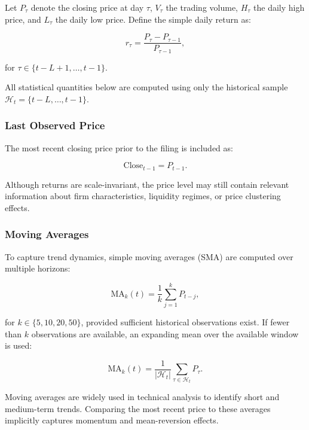 Let $P_\tau$ denote the closing price at day $\tau$, $V_\tau$ the trading volume, $H_\tau$ the daily high price, and $L_\tau$ the daily low price. Define the simple daily return as:

\begin{equation}
r_\tau = \frac{P_\tau - P_{\tau-1}}{P_{\tau-1}},
\end{equation}

for $\tau \in \{t-L+1, \dots, t-1\}$.

All statistical quantities below are computed using only the historical sample $\mathcal{H}_t = \{t-L, \dots, t-1\}$.

\subsubsection*{Last Observed Price}

The most recent closing price prior to the filing is included as:

\begin{equation}
\text{Close}_{t-1} = P_{t-1}.
\end{equation}

Although returns are scale-invariant, the price level may still contain relevant information about firm characteristics, liquidity regimes, or price clustering effects.

\subsubsection*{Moving Averages}

To capture trend dynamics, simple moving averages (SMA) are computed over multiple horizons:

\begin{equation}
\text{MA}_k(t) = \frac{1}{k} \sum_{j=1}^{k} P_{t-j},
\end{equation}

for $k \in \{5, 10, 20, 50\}$, provided sufficient historical observations exist. If fewer than $k$ observations are available, an expanding mean over the available window is used:

\begin{equation}
\text{MA}_k(t) = \frac{1}{|\mathcal{H}_t|} \sum_{\tau \in \mathcal{H}_t} P_\tau.
\end{equation}

Moving averages are widely used in technical analysis to identify short and medium-term trends. Comparing the most recent price to these averages implicitly captures momentum and mean-reversion effects.

